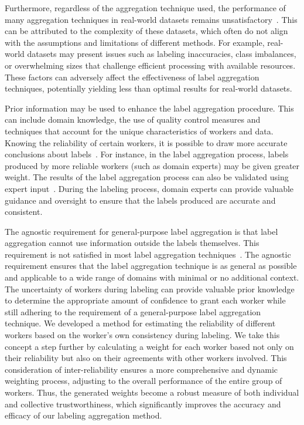 Furthermore, regardless of the aggregation technique used, the performance of many aggregation techniques in real-world datasets remains unsatisfactory~\cite{liu_Exploiting_2021}. This can be attributed to the complexity of these datasets, which often do not align with the assumptions and limitations of different methods. For example, real-world datasets may present issues such as labeling inaccuracies, class imbalances, or overwhelming sizes that challenge efficient processing with available resources. These factors can adversely affect the effectiveness of label aggregation techniques, potentially yielding less than optimal results for real-world datasets.

Prior information may be used to enhance the label aggregation procedure.
This can include domain knowledge, the use of quality control measures and techniques that account for the unique characteristics of workers and data. Knowing the reliability of certain workers, it is possible to draw more accurate conclusions about labels~\cite{li_Crowdsourced_2017}. For instance, in the label aggregation process, labels produced by more reliable workers (such as domain experts) may be given greater weight. The results of the label aggregation process can also be validated using expert input~\cite{liu_Improving_2017}. During the labeling process, domain experts can provide valuable guidance and oversight to ensure that the labels produced are accurate and consistent.

The agnostic requirement for general-purpose label aggregation is that label aggregation cannot use information outside the labels themselves. This requirement is not satisfied in most label aggregation techniques~\cite{zhang_Crowdsourced_2019}. The agnostic requirement ensures that the label aggregation technique is as general as possible and applicable to a wide range of domains with minimal or no additional context.
The uncertainty of workers during labeling can provide valuable prior knowledge to determine the appropriate amount of confidence to grant each worker while still adhering to the requirement of a general-purpose label aggregation technique. We developed a method for estimating the reliability of different workers based on the worker's own consistency during labeling. We take this concept a step further by calculating a weight for each worker based not only on their reliability but also on their agreements with other workers involved. This consideration of inter-reliability ensures a more comprehensive and dynamic weighting process, adjusting to the overall performance of the entire group of workers. Thus, the generated weights become a robust measure of both individual and collective trustworthiness, which significantly improves the accuracy and efficacy of our labeling aggregation method.

